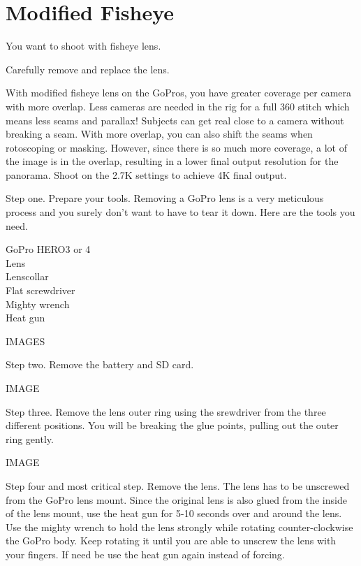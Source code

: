 \chapter{Modified Fisheye}
\pagecolor{white}
\label{chap:26}
\begin{fullwidth}

\problem

{\large You want to shoot with fisheye lens.\par}


\solution

{\large Carefully remove and replace the lens. \par}

With modified fisheye lens on the GoPros, you have greater coverage per camera with more overlap. Less cameras are needed in the rig for a full 360 stitch which means less seams and parallax! Subjects can get real close to a camera without breaking a seam. With more overlap, you can also shift the seams when rotoscoping or masking. However, since there is so much more coverage, a lot of the image is in the overlap, resulting in a lower final output resolution for the panorama. Shoot on the 2.7K settings to achieve 4K final output. 


Step one. Prepare your tools. Removing a GoPro lens is a very meticulous process and you surely don't want to have to tear it down. Here are the tools you need. 

GoPro HERO3 or 4
\\
Lens
\\
Lenscollar
\\
Flat screwdriver
\\
Mighty wrench
\\
Heat gun

IMAGES

Step two. Remove the battery and SD card.

IMAGE

Step three. Remove the lens outer ring using the srewdriver from the three different positions. You will be breaking the glue points, pulling out the outer ring gently.

IMAGE

Step four and most critical step. Remove the lens. The lens has to be unscrewed from the GoPro lens mount. Since the original lens is also glued from the inside of the lens mount, use the heat gun for 5-10 seconds over and around the lens. Use the mighty wrench to hold the lens strongly while rotating counter-clockwise the GoPro body. Keep rotating it until you are able to unscrew the lens with your fingers. If need be use the heat gun again instead of forcing.


\end{fullwidth}
